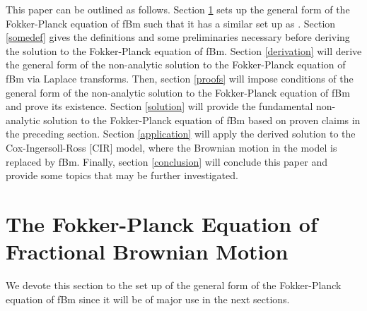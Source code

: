 \documentclass[preprint, 12pt]{elsarticle}
\numberwithin{equation}{section}
\theoremstyle{plain}
\theoremstyle{remark}
\begin{document}
This paper can be outlined as follows. Section \ref{FPfBm} sets up the general form of the Fokker-Planck equation of fBm such that it has a similar set up as \citep{Feller}. Section \ref{somedef} gives the definitions and some preliminaries necessary before deriving the solution to the Fokker-Planck equation of fBm. Section \ref{derivation} will derive the general form of the non-analytic solution to the Fokker-Planck equation of fBm via Laplace transforms. Then, section \ref{proofs} will impose conditions of the general form of the non-analytic solution to the Fokker-Planck equation of fBm and prove its existence. Section \ref{solution} will provide the fundamental non-analytic solution to the Fokker-Planck equation of fBm based on proven claims in the preceding section. Section \ref{application} will apply the derived solution to the Cox-Ingersoll-Ross [CIR] model, where the Brownian motion in the model is replaced by fBm. Finally, section \ref{conclusion} will conclude this paper and provide some topics that may be further investigated.


\section{The Fokker-Planck Equation of Fractional Brownian Motion}\label{FPfBm}

We devote this section to the set up of the general form of the Fokker-Planck equation of fBm since it will be of major use in the next sections.
\end{document}

